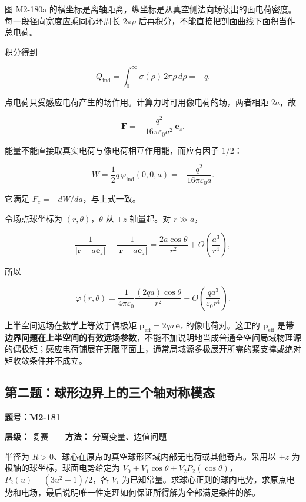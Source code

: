 图 M2-180a
的横坐标是离轴距离，纵坐标是从真空侧法向场读出的面电荷密度。每一段径向宽度应乘同心环周长
\(2\pi\rho\) 后再积分，不能直接把剖面曲线下面积当作总电荷。

积分得到

\[
Q_{\mathrm{ind}}
=\int_0^{\infty}\sigma(\rho)\,2\pi\rho\,d\rho
=-q.
\]

点电荷只受感应电荷产生的场作用。计算力时可用像电荷的场，两者相距
\(2a\)，故

\[
\boxed{
\mathbf F
=-\frac{q^2}{16\pi\varepsilon_0a^2}\,\mathbf e_z
}.
\]

能量不能直接取真实电荷与像电荷相互作用能，而应有因子 \(1/2\)：

\[
\boxed{
W=\frac12q\,\varphi_{\mathrm{ind}}(0,0,a)
=-\frac{q^2}{16\pi\varepsilon_0a}
}.
\]

它满足 \(F_z=-dW/da\)，与上式一致。

令场点球坐标为 \((r,\theta)\)，\(\theta\) 从 \(+z\) 轴量起。对
\(r\gg a\)，

\[
\frac1{|\mathbf r-a\mathbf e_z|}
-\frac1{|\mathbf r+a\mathbf e_z|}
=\frac{2a\cos\theta}{r^2}
+O\!\left(\frac{a^3}{r^4}\right),
\]

所以

\[
\boxed{
\varphi(r,\theta)
=\frac1{4\pi\varepsilon_0}
\frac{(2qa)\cos\theta}{r^2}
+O\!\left(\frac{qa^3}{\varepsilon_0r^4}\right)
}.
\]

上半空间远场在数学上等效于偶极矩
\(\mathbf p_{\mathrm{eff}}=2qa\,\mathbf e_z\) 的像电荷对。这里的
\(\mathbf p_{\mathrm{eff}}\)
是\textbf{带边界问题在上半空间的有效远场参数}，不能不加说明地当成普通全空间局域物理源的偶极矩；感应电荷铺展在无限平面上，通常局域源多极展开所需的紧支撑或绝对矩收敛条件并不成立。

\subsection{第二题：球形边界上的三个轴对称模态}\label{m2:ux7b2cux4e8cux9898ux7403ux5f62ux8fb9ux754cux4e0aux7684ux4e09ux4e2aux8f74ux5bf9ux79f0ux6a21ux6001}

\textbf{题号：M2-181}

\textbf{层级：} 复赛　　\textbf{方法：} 分离变量、边值问题

半径为 \(R>0\)、球心在原点的真空球形区域内部无电荷或其他奇点。采用以
\(+z\) 为极轴的球坐标，球面电势给定为
\(V_0+V_1\cos\theta+V_2P_2(\cos\theta)\)，\(P_2(u)=(3u^2-1)/2\)，各
\(V_i\)
为已知常量。求球心正则的球内电势，求原点电势和电场，最后说明唯一性定理如何保证所得解为全部满足条件的解。

